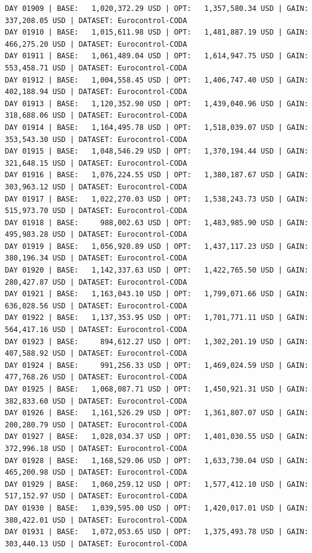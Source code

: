 \documentclass[11pt,a4paper]{article}
\begin{document}
\begin{verbatim}
DAY 01909 | BASE:   1,020,372.29 USD | OPT:   1,357,580.34 USD | GAIN: 337,208.05 USD | DATASET: Eurocontrol-CODA
DAY 01910 | BASE:   1,015,611.98 USD | OPT:   1,481,887.19 USD | GAIN: 466,275.20 USD | DATASET: Eurocontrol-CODA
DAY 01911 | BASE:   1,061,489.04 USD | OPT:   1,614,947.75 USD | GAIN: 553,458.71 USD | DATASET: Eurocontrol-CODA
DAY 01912 | BASE:   1,004,558.45 USD | OPT:   1,406,747.40 USD | GAIN: 402,188.94 USD | DATASET: Eurocontrol-CODA
DAY 01913 | BASE:   1,120,352.90 USD | OPT:   1,439,040.96 USD | GAIN: 318,688.06 USD | DATASET: Eurocontrol-CODA
DAY 01914 | BASE:   1,164,495.78 USD | OPT:   1,518,039.07 USD | GAIN: 353,543.30 USD | DATASET: Eurocontrol-CODA
DAY 01915 | BASE:   1,048,546.29 USD | OPT:   1,370,194.44 USD | GAIN: 321,648.15 USD | DATASET: Eurocontrol-CODA
DAY 01916 | BASE:   1,076,224.55 USD | OPT:   1,380,187.67 USD | GAIN: 303,963.12 USD | DATASET: Eurocontrol-CODA
DAY 01917 | BASE:   1,022,270.03 USD | OPT:   1,538,243.73 USD | GAIN: 515,973.70 USD | DATASET: Eurocontrol-CODA
DAY 01918 | BASE:     988,002.63 USD | OPT:   1,483,985.90 USD | GAIN: 495,983.28 USD | DATASET: Eurocontrol-CODA
DAY 01919 | BASE:   1,056,920.89 USD | OPT:   1,437,117.23 USD | GAIN: 380,196.34 USD | DATASET: Eurocontrol-CODA
DAY 01920 | BASE:   1,142,337.63 USD | OPT:   1,422,765.50 USD | GAIN: 280,427.87 USD | DATASET: Eurocontrol-CODA
DAY 01921 | BASE:   1,163,043.10 USD | OPT:   1,799,071.66 USD | GAIN: 636,028.56 USD | DATASET: Eurocontrol-CODA
DAY 01922 | BASE:   1,137,353.95 USD | OPT:   1,701,771.11 USD | GAIN: 564,417.16 USD | DATASET: Eurocontrol-CODA
DAY 01923 | BASE:     894,612.27 USD | OPT:   1,302,201.19 USD | GAIN: 407,588.92 USD | DATASET: Eurocontrol-CODA
DAY 01924 | BASE:     991,256.33 USD | OPT:   1,469,024.59 USD | GAIN: 477,768.26 USD | DATASET: Eurocontrol-CODA
DAY 01925 | BASE:   1,068,087.71 USD | OPT:   1,450,921.31 USD | GAIN: 382,833.60 USD | DATASET: Eurocontrol-CODA
DAY 01926 | BASE:   1,161,526.29 USD | OPT:   1,361,807.07 USD | GAIN: 200,280.79 USD | DATASET: Eurocontrol-CODA
DAY 01927 | BASE:   1,028,034.37 USD | OPT:   1,401,030.55 USD | GAIN: 372,996.18 USD | DATASET: Eurocontrol-CODA
DAY 01928 | BASE:   1,168,529.06 USD | OPT:   1,633,730.04 USD | GAIN: 465,200.98 USD | DATASET: Eurocontrol-CODA
DAY 01929 | BASE:   1,060,259.12 USD | OPT:   1,577,412.10 USD | GAIN: 517,152.97 USD | DATASET: Eurocontrol-CODA
DAY 01930 | BASE:   1,039,595.00 USD | OPT:   1,420,017.01 USD | GAIN: 380,422.01 USD | DATASET: Eurocontrol-CODA
DAY 01931 | BASE:   1,072,053.65 USD | OPT:   1,375,493.78 USD | GAIN: 303,440.13 USD | DATASET: Eurocontrol-CODA

\end{verbatim}
\end{document}
